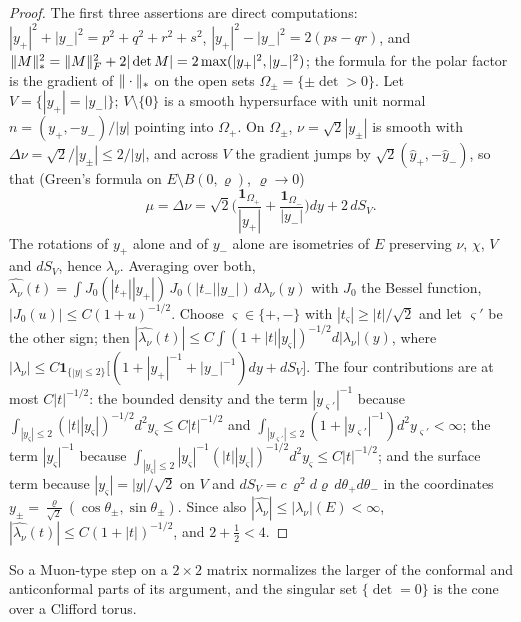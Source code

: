 \begin{proof}
The first three assertions are direct computations: $|y_+|^2+|y_-|^2=p^2+q^2+r^2+s^2$,
$|y_+|^2-|y_-|^2=2(ps-qr)$, and $\|M\|_{*}^2=\|M\|_{F}^2+2|\det M|=2\max(|y_+|^2,|y_-|^2)$; the formula for the polar factor
is the gradient of $\|\cdot\|_{*}$ on the open sets $\Omega_\pm=\{\pm\det>0\}$. Let $V=\{|y_+|=|y_-|\}$; $V\setminus\{0\}$ is a
smooth hypersurface with unit normal $n=(y_+,-y_-)/|y|$ pointing into $\Omega_+$. On $\Omega_\pm$,
$\nu=\sqrt2|y_\pm|$ is smooth with $\Delta\nu=\sqrt2/|y_\pm|\le2/|y|$, and across $V$ the gradient jumps by
$\sqrt2(\hat y_+,-\hat y_-)$, so that (Green's formula on $E\setminus B(0,\varrho)$, $\varrho\to0$)
\[
\mu=\Delta\nu=\sqrt2\Big(\frac{\mathbf 1_{\Omega_+}}{|y_+|}+\frac{\mathbf 1_{\Omega_-}}{|y_-|}\Big)dy+2\,dS_V .
\]
The rotations of $y_+$ alone and of $y_-$ alone are isometries of $E$ preserving $\nu$, $\chi$, $V$ and $dS_V$, hence
$\lambda_\nu$. Averaging over both,
$\widehat{\lambda_\nu}(t)=\int J_0(|t_+||y_+|)\,J_0(|t_-||y_-|)\,d\lambda_\nu(y)$ with $J_0$ the Bessel function,
$|J_0(u)|\le C(1+u)^{-1/2}$. Choose $\varsigma\in\{+,-\}$ with $|t_\varsigma|\ge|t|/\sqrt2$ and let $\varsigma'$ be the other
sign; then $|\widehat{\lambda_\nu}(t)|\le C\int(1+|t||y_\varsigma|)^{-1/2}d|\lambda_\nu|(y)$, where
$|\lambda_\nu|\le C\mathbf 1_{\{|y|\le2\}}\big[(1+|y_+|^{-1}+|y_-|^{-1})dy+dS_V\big]$. The four contributions are at most
$C|t|^{-1/2}$: the bounded density and the term $|y_{\varsigma'}|^{-1}$ because
$\int_{|y_\varsigma|\le2}(|t||y_\varsigma|)^{-1/2}d^2y_\varsigma\le C|t|^{-1/2}$ and
$\int_{|y_{\varsigma'}|\le2}(1+|y_{\varsigma'}|^{-1})d^2y_{\varsigma'}<\infty$; the term $|y_\varsigma|^{-1}$ because
$\int_{|y_\varsigma|\le2}|y_\varsigma|^{-1}(|t||y_\varsigma|)^{-1/2}d^2y_\varsigma\le C|t|^{-1/2}$; and the surface term because
$|y_\varsigma|=|y|/\sqrt2$ on $V$ and $dS_V=c\,\varrho^2d\varrho\,d\theta_+d\theta_-$ in the coordinates
$y_\pm=\frac{\varrho}{\sqrt2}(\cos\theta_\pm,\sin\theta_\pm)$. Since also $|\widehat{\lambda_\nu}|\le|\lambda_\nu|(E)<\infty$,
$|\widehat{\lambda_\nu}(t)|\le C(1+|t|)^{-1/2}$, and $2+\frac12<4$.
\end{proof}

So a Muon-type step on a $2\times2$ matrix normalizes the larger of the conformal and anticonformal parts of its
argument, and the singular set $\{\det=0\}$ is the cone over a Clifford torus.
